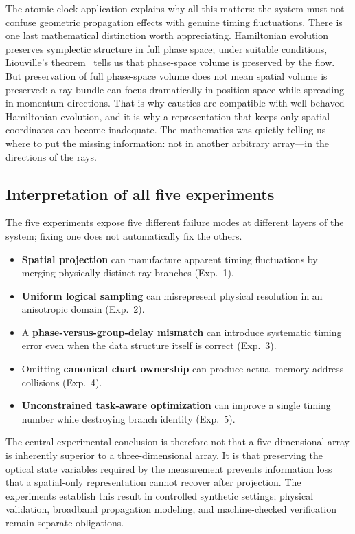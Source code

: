 \documentclass[11pt]{article}
\begin{document}
The atomic-clock application explains why all this matters: the system must not confuse
geometric propagation effects with genuine timing fluctuations. There is one last
mathematical distinction worth appreciating. Hamiltonian evolution preserves symplectic
structure in full phase space; under suitable conditions, Liouville's
theorem~\cite{liouville1838} tells us
that phase-space volume is preserved by the flow. But preservation of full phase-space
volume does not mean spatial volume is preserved: a ray bundle can focus dramatically in
position space while spreading in momentum directions. That is why caustics are
compatible with well-behaved Hamiltonian evolution, and it is why a representation that
keeps only spatial coordinates can become inadequate. The mathematics was quietly telling
us where to put the missing information: not in another arbitrary array---in the
directions of the rays.

\subsection{Interpretation of all five experiments}

The five experiments expose five different failure modes at different layers of the
system; fixing one does not automatically fix the others.

\begin{itemize}[nosep]
\item \textbf{Spatial projection} can manufacture apparent timing fluctuations by merging
physically distinct ray branches (Exp.~1).
\item \textbf{Uniform logical sampling} can misrepresent physical resolution in an
anisotropic domain (Exp.~2).
\item A \textbf{phase-versus-group-delay mismatch} can introduce systematic timing error
even when the data structure itself is correct (Exp.~3).
\item Omitting \textbf{canonical chart ownership} can produce actual memory-address
collisions (Exp.~4).
\item \textbf{Unconstrained task-aware optimization} can improve a single timing number
while destroying branch identity (Exp.~5).
\end{itemize}

The central experimental conclusion is therefore not that a five-dimensional array is
inherently superior to a three-dimensional array. It is that preserving the optical state
variables required by the measurement prevents information loss that a spatial-only
representation cannot recover after projection. The experiments establish this result in
controlled synthetic settings; physical validation, broadband propagation modeling, and
machine-checked verification remain separate obligations.
\end{document}
